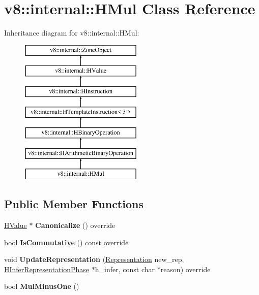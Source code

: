 \hypertarget{classv8_1_1internal_1_1_h_mul}{}\section{v8\+:\+:internal\+:\+:H\+Mul Class Reference}
\label{classv8_1_1internal_1_1_h_mul}
Inheritance diagram for v8\+:\+:internal\+:\+:H\+Mul\+:\begin{figure}[H]
\begin{center}
\leavevmode
\includegraphics[height=7.000000cm]{classv8_1_1internal_1_1_h_mul}
\end{center}
\end{figure}
\subsection*{Public Member Functions}
\begin{DoxyCompactItemize}
\item 
\hyperlink{classv8_1_1internal_1_1_h_value}{H\+Value} $\ast$ {\bfseries Canonicalize} () override\hypertarget{classv8_1_1internal_1_1_h_mul_a81a647492e6ed5b83adb171a1d7e6725}{}\label{classv8_1_1internal_1_1_h_mul_a81a647492e6ed5b83adb171a1d7e6725}

\item 
bool {\bfseries Is\+Commutative} () const  override\hypertarget{classv8_1_1internal_1_1_h_mul_a587af43ec7cf5ecd8bc9afd27c7d327e}{}\label{classv8_1_1internal_1_1_h_mul_a587af43ec7cf5ecd8bc9afd27c7d327e}

\item 
void {\bfseries Update\+Representation} (\hyperlink{classv8_1_1internal_1_1_representation}{Representation} new\+\_\+rep, \hyperlink{classv8_1_1internal_1_1_h_infer_representation_phase}{H\+Infer\+Representation\+Phase} $\ast$h\+\_\+infer, const char $\ast$reason) override\hypertarget{classv8_1_1internal_1_1_h_mul_a6d2ae208821a137440d272169ea60375}{}\label{classv8_1_1internal_1_1_h_mul_a6d2ae208821a137440d272169ea60375}

\item 
bool {\bfseries Mul\+Minus\+One} ()\hypertarget{classv8_1_1internal_1_1_h_mul_a11164e7693b7539f62588edf56048017}{}\label{classv8_1_1internal_1_1_h_mul_a11164e7693b7539f62588edf56048017}

\end{DoxyCompactItemize}
